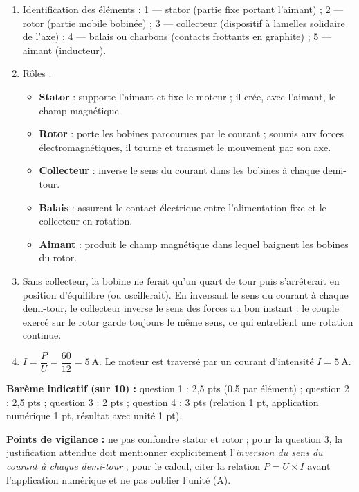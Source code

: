 \documentclass[11pt]{article}
\newcounter{popsec}
\newcounter{popsub}
\newcommand{\courssub}[1]{%
  \stepcounter{popsub}%
  \par\vspace{9pt}\noindent{\popxbold\fontsize{11.5}{13}\selectfont\color{popink}{\color{poporange}\thepopsec.\thepopsub}\hspace{6pt}#1}\par\nopagebreak\vspace{4pt}
}
\begin{document}
\courssub{Je me prépare au Bac}

\begin{corrige}
\begin{enumerate}
\item Identification des éléments : 1 — stator (partie fixe portant l'aimant) ; 2 — rotor (partie mobile bobinée) ; 3 — collecteur (dispositif à lamelles solidaire de l'axe) ; 4 — balais ou charbons (contacts frottants en graphite) ; 5 — aimant (inducteur).
\item Rôles :
\begin{itemize}
\item \textbf{Stator} : supporte l'aimant et fixe le moteur ; il crée, avec l'aimant, le champ magnétique.
\item \textbf{Rotor} : porte les bobines parcourues par le courant ; soumis aux forces électromagnétiques, il tourne et transmet le mouvement par son axe.
\item \textbf{Collecteur} : inverse le sens du courant dans les bobines à chaque demi-tour.
\item \textbf{Balais} : assurent le contact électrique entre l'alimentation fixe et le collecteur en rotation.
\item \textbf{Aimant} : produit le champ magnétique dans lequel baignent les bobines du rotor.
\end{itemize}
\item Sans collecteur, la bobine ne ferait qu'un quart de tour puis s'arrêterait en position d'équilibre (ou oscillerait). En inversant le sens du courant à chaque demi-tour, le collecteur inverse le sens des forces au bon instant : le couple exercé sur le rotor garde toujours le même sens, ce qui entretient une rotation continue.
\item $I = \dfrac{P}{U} = \dfrac{60}{12} = 5~\text{A}$. Le moteur est traversé par un courant d'intensité $\boxed{I = 5~\text{A}}$.
\end{enumerate}
\textbf{Barème indicatif (sur 10) :} question 1 : 2,5 pts (0,5 par élément) ; question 2 : 2,5 pts ; question 3 : 2 pts ; question 4 : 3 pts (relation 1 pt, application numérique 1 pt, résultat avec unité 1 pt).

\textbf{Points de vigilance :} ne pas confondre stator et rotor ; pour la question 3, la justification attendue doit mentionner explicitement l'\emph{inversion du sens du courant à chaque demi-tour} ; pour le calcul, citer la relation $P = U \times I$ avant l'application numérique et ne pas oublier l'unité (\si{A}).
\end{corrige}
\end{document}
